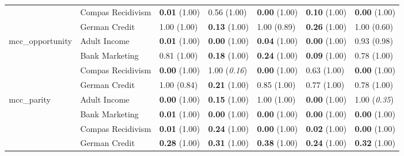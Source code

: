 \begin{tabular}{lllllll}
 & Compas Recidivism & \textbf{0.01} (1.00) & 0.56 (1.00) & \textbf{0.00} (1.00) & \textbf{0.10} (1.00) & \textbf{0.00} (1.00) \\
 & German Credit & 1.00 (1.00) & \textbf{0.13} (1.00) & 1.00 (0.89) & \textbf{0.26} (1.00) & 1.00 (0.60) \\
\cline{1-7}
\multirow[t]{4}{*}{mcc_opportunity} & Adult Income & \textbf{0.01} (1.00) & \textbf{0.00} (1.00) & \textbf{0.04} (1.00) & \textbf{0.00} (1.00) & 0.93 (0.98) \\
 & Bank Marketing & 0.81 (1.00) & \textbf{0.18} (1.00) & \textbf{0.24} (1.00) & \textbf{0.09} (1.00) & 0.78 (1.00) \\
 & Compas Recidivism & \textbf{0.00} (1.00) & 1.00 (\textit{0.16}) & \textbf{0.00} (1.00) & 0.63 (1.00) & \textbf{0.00} (1.00) \\
 & German Credit & 1.00 (0.84) & \textbf{0.21} (1.00) & 0.85 (1.00) & 0.77 (1.00) & 0.78 (1.00) \\
\cline{1-7}
\multirow[t]{4}{*}{mcc_parity} & Adult Income & \textbf{0.00} (1.00) & \textbf{0.15} (1.00) & 1.00 (1.00) & \textbf{0.00} (1.00) & 1.00 (\textit{0.35}) \\
 & Bank Marketing & \textbf{0.01} (1.00) & \textbf{0.00} (1.00) & \textbf{0.00} (1.00) & \textbf{0.00} (1.00) & \textbf{0.00} (1.00) \\
 & Compas Recidivism & \textbf{0.01} (1.00) & \textbf{0.24} (1.00) & \textbf{0.00} (1.00) & \textbf{0.02} (1.00) & \textbf{0.00} (1.00) \\
 & German Credit & \textbf{0.28} (1.00) & \textbf{0.31} (1.00) & \textbf{0.38} (1.00) & \textbf{0.24} (1.00) & \textbf{0.32} (1.00) \\
\cline{1-7}
\bottomrule
\end{tabular}
